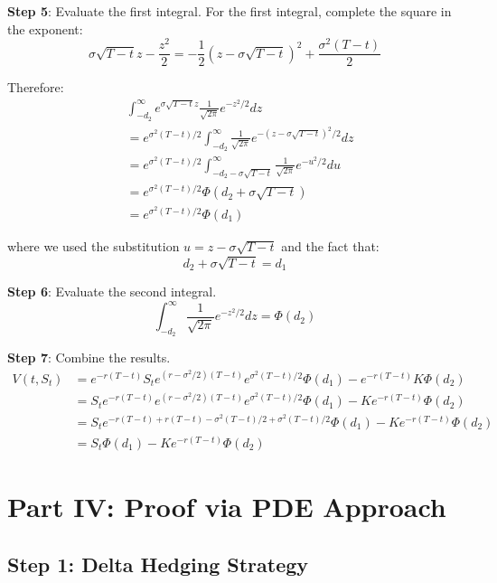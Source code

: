 \documentclass[
  letterpaper,
  DIV=11,
  numbers=noendperiod]{scrartcl}
\begin{document}
\begin{tcolorbox}
\textbf{Step 5}: Evaluate the first integral. For the first integral,
complete the square in the exponent:
\[\sigma\sqrt{T-t} z - \frac{z^2}{2} = -\frac{1}{2}(z - \sigma\sqrt{T-t})^2 + \frac{\sigma^2(T-t)}{2}\]

Therefore: \begin{align}
&\int_{-d_2}^{\infty} e^{\sigma\sqrt{T-t} z} \frac{1}{\sqrt{2\pi}} e^{-z^2/2} dz \\
&= e^{\sigma^2(T-t)/2} \int_{-d_2}^{\infty} \frac{1}{\sqrt{2\pi}} e^{-(z-\sigma\sqrt{T-t})^2/2} dz \\
&= e^{\sigma^2(T-t)/2} \int_{-d_2-\sigma\sqrt{T-t}}^{\infty} \frac{1}{\sqrt{2\pi}} e^{-u^2/2} du \\
&= e^{\sigma^2(T-t)/2} \Phi(d_2 + \sigma\sqrt{T-t}) \\
&= e^{\sigma^2(T-t)/2} \Phi(d_1)
\end{align}

where we used the substitution \(u = z - \sigma\sqrt{T-t}\) and the fact
that: \[d_2 + \sigma\sqrt{T-t} = d_1\]

\textbf{Step 6}: Evaluate the second integral.
\[\int_{-d_2}^{\infty} \frac{1}{\sqrt{2\pi}} e^{-z^2/2} dz = \Phi(d_2)\]

\textbf{Step 7}: Combine the results. \begin{align}
V(t, S_t) &= e^{-r(T-t)} S_t e^{(r-\sigma^2/2)(T-t)} e^{\sigma^2(T-t)/2} \Phi(d_1) - e^{-r(T-t)} K \Phi(d_2) \\
&= S_t e^{-r(T-t)} e^{(r-\sigma^2/2)(T-t)} e^{\sigma^2(T-t)/2} \Phi(d_1) - K e^{-r(T-t)} \Phi(d_2) \\
&= S_t e^{-r(T-t) + r(T-t) - \sigma^2(T-t)/2 + \sigma^2(T-t)/2} \Phi(d_1) - K e^{-r(T-t)} \Phi(d_2) \\
&= S_t \Phi(d_1) - K e^{-r(T-t)} \Phi(d_2)
\end{align}

\end{tcolorbox}

\hypertarget{part-iv-proof-via-pde-approach}{%
\section{Part IV: Proof via PDE
Approach}\label{part-iv-proof-via-pde-approach}}

\hypertarget{step-1-delta-hedging-strategy}{%
\subsection{Step 1: Delta Hedging
Strategy}\label{step-1-delta-hedging-strategy}}
\end{document}
